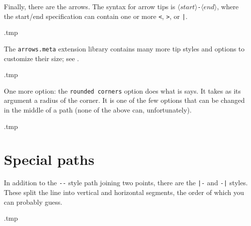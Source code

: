 Finally, there are the arrows.
The syntax for arrow tips is $\langle\textit{start}\rangle$\verb|-|$\langle\textit{end}\rangle$,
where the start/end specification can contain one or more \verb|<|, \verb|>|, or \verb$|$.
%
\begin{VerbatimOut}{\jobname.tmp}
\end{VerbatimOut}
\ShowExample
%
The \verb|arrows.meta| extension library contains many more tip styles
and options to customize their size; see \cite[Section~16]{tikz}.
%
\begin{VerbatimOut}{\jobname.tmp}
\end{VerbatimOut}
\ShowExampleBelow

One more option: the \verb|rounded corners| option does what is says.
It takes as its argument a radius of the corner.
It is one of the few options that can be changed in the middle of a path
(none of the above can, unfortunately).
%
\begin{VerbatimOut}{\jobname.tmp}
\end{VerbatimOut}
\ShowExample



%
%
%
\section{Special paths}

In addition to the \verb|--| style path joining two points,
there are the \verb$|-$ and \verb$-|$ styles.
These split the line into vertical and horizontal segments,
the order of which you can probably guess.
%
\begin{VerbatimOut}{\jobname.tmp}
\end{VerbatimOut}
\ShowExample


